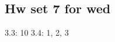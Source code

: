 \documentclass{amsart}
\numberwithin{equation}{section}
\theoremstyle{definition}
\theoremstyle{remark}
\begin{document}
\subsection*{Hw set 7 for wed}
3.3: 10 
3.4: 1, 2, 3
\end{document}
